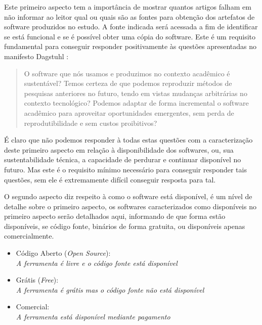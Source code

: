 Este primeiro aspecto tem a importância de mostrar quantos artigos falham em
não informar ao leitor qual ou quais são as fontes para obtenção dos artefatos
de software produzidos no estudo. A fonte indicada será acessada a fim de
identificar se está funcional e se é possível obter uma cópia do software.
Este é um requisito fundamental para conseguir responder positivamente às
questões apresentadas no manifesto Dagstuhl \cite{allen2017engineering}:

\begin{quote}
  O software que nós usamos e produzimos no contexto acadêmico é sustentável?
  Temos certeza de que podemos reproduzir métodos de pesquisas anteriores no
  futuro, tendo em vistas mudanças arbitrárias no contexto tecnológico?
  Podemos adaptar de forma incremental o software acadêmico para aproveitar
  oportunidades emergentes, sem perda de reprodutibilidade e sem custos
  proibitivos?
\end{quote}


É claro que não podemos responder à todas estas questões com a caracterização deste
primeiro aspecto em relação à disponibilidade dos softwares, ou, sua sustentabilidade
técnica, a capacidade de perdurar e continuar disponível no futuro. Mas este é o requisito
mínimo necessário para conseguir responder tais questões, sem ele é extremamente difícil
conseguir resposta para tal.

O segundo aspecto diz respeito à como o software está disponível, é um nível de
detalhe sobre o primeiro aspecto, os softwares caracterizados como disponíveis
no primeiro aspecto serão detalhados aqui, informando de que forma estão
disponíveis, se código fonte, binários de forma gratuita, ou disponíveis apenas
comercialmente.

\begin{itemize}
  \item Código Aberto ({\it Open Source}):\\
    {\it A ferramenta é livre e o código fonte está disponível}
  \item Grátis ({\it Free}):\\
    {\it A ferramenta é grátis mas o código fonte não está disponível}
  \item Comercial:\\
    {\it A ferramenta está disponível mediante pagamento}
\end{itemize}

